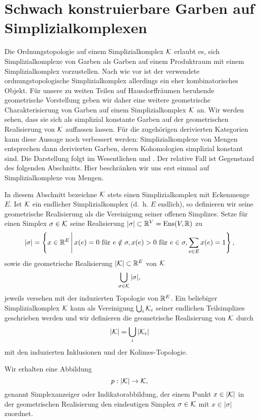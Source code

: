 
\section{Schwach konstruierbare Garben auf Simplizialkomplexen}
\label{sec:simp-comp-sk}

Die Ordnungstopologie auf einem Simplizialkomplex $\mathcal{K}$ erlaubt es,
sich Simplizialkomplexe von Garben als Garben auf einem Produktraum
mit einem Simplizialkomplex vorzustellen. Nach wie vor ist der
verwendete ordnungstopologische Simplizialkomplex allerdings ein eher
kombinatorisches Objekt. Für unsere zu weiten Teilen auf
Hausdorffräumen beruhende geometrische Vorstellung geben wir daher
eine weitere geometrische Charakterisierung von Garben auf einem
Simplizialkomplex $\mathcal{K}$ an. Wir werden sehen, dass sie sich als
simplizial konstante Garben auf der geometrischen Realisierung von
$\mathcal{K}$ auffassen lassen. Für die zugehörigen derivierten Kategorien kann
diese Aussage noch verbessert werden: Simplizialkomplexe von Mengen
entsprechen dann derivierten Garben, deren Kohomologien simplizial
konstant sind. Die Darstellung folgt im Wesentlichen \cite{KS} und
\cite{WS}. Der relative Fall ist Gegenstand des folgenden
Abschnitts. Hier beschränken wir uns erst einmal auf
Simplizialkomplexe von Mengen.


In diesem Abschnitt bezeichne $\mathcal{K}$ stets einen Simplizialkomplex mit
Eckenmenge $E$. Ist $\mathcal{K}$ ein endlicher Simplizialkomplex (d.~h. $E$
endlich), so definieren wir seine geometrische Realisierung als die
Vereinigung seiner offenen Simplizes. Setze für einen Simplex $\sigma
\in \mathcal{K}$ seine Realisierung $|\sigma| \subset \mathbb{R}^V = \operatorname{Ens}(V, \mathbb{R})$ zu
\[ |\sigma| = \left\{ x \in \mathbb{R}^E \,\middle|\, x(e) = 0 \text{ für } e \notin \sigma,
   x(e) > 0 \text{ für } e \in \sigma,
   \sum_{e \in E} x(e) = 1  \right\},
\]
sowie die geometrische Realisierung $|\mathcal{K}| \subset \mathbb{R}^E$ von $\mathcal{K}$
\[ \bigcup_{\sigma \in \mathcal{K}} |\sigma|, \]
jeweils versehen mit der induzierten Topologie von $\mathbb{R}^E$. Ein
beliebiger Simplizialkomplex $\mathcal{K}$ kann als Vereinigung $\bigcup_i
\mathcal{K}_i$ seiner endlichen Teilsimplizes geschrieben werden und wir
definieren die geometrische Realisierung von $\mathcal{K}$ durch
\[ |\mathcal{K}| = \bigcup_i |\mathcal{K}_i| \]
mit den induzierten Inklusionen und der Kolimes-Topologie.

Wir erhalten eine Abbildung
\[ p: |\mathcal{K}| \to \mathcal{K}, \]
genannt Simplexanzeiger oder Indikatorabbildung, der einem Punkt $x
\in |\mathcal{K}|$ in der geometrischen Realisierung den eindeutigen Simplex
$\sigma \in \mathcal{K}$ mit $x \in |\sigma|$ zuordnet.


